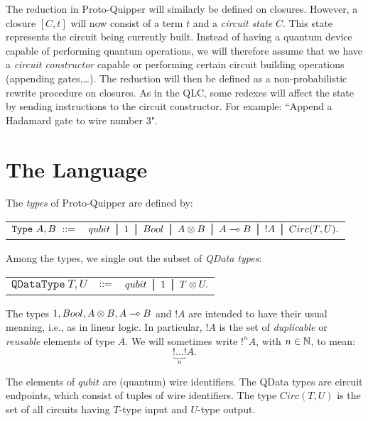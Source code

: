 \documentclass{article}
\begin{document}
The reduction in Proto-Quipper will similarly be defined on closures. However, a 
closure $[C,t]$ will now consist of a term $t$ and a \emph{circuit state} $C$. This 
state represents the circuit being currently built. Instead of having a quantum device 
capable of performing quantum operations, we will therefore assume that we have a 
\emph{circuit constructor} capable or performing certain circuit building operations 
(appending gates,\ldots). The reduction will then be defined as a non-probabilistic rewrite 
procedure on closures. As in the QLC, some redexes will affect the state by sending 
instructions to the circuit constructor. For example: ``Append a Hadamard gate to 
wire number 3".


\section{The Language}

\begin{definition} 
The \emph{types} of Proto-Quipper are defined by:
\begin{center}
\begin{tabular}{rl}
$\mathtt{Type}~A,B~::=$ & $ qubit \bor 1 \bor Bool \bor A\tensor B \bor A\loli B 
\bor !A \bor Circ (T,U).$\\
\end{tabular}
\end{center}
Among the types, we single out the subset of \emph{QData types}:
\begin{center}
\begin{tabular}{rcl}
$\mathtt{QDataType}~T,U$ & $::=$ & $qubit \bor 1 \bor T \tensor U.$
\end{tabular}
\end{center}
\end{definition}

The types $1,Bool, A\otimes B, A\multimap B$ and $!A$ are intended to have their usual 
meaning, i.e., as in linear logic. In particular, $!A$ is the set of 
\emph{duplicable} or \emph{reusable} elements of type $A$. We will 
sometimes write $!^nA$, with $n\in\mathbb{N}$, to mean: 
\[
\underbrace{!\ldots !}_{n} A.
\]

The elements of $qubit$ are (quantum) wire identifiers. The QData types are 
circuit endpoints, which consist of tuples of wire identifiers. The type 
$Circ(T,U)$ is the set of all circuits having $T$-type input and $U$-type 
output. 
\end{document}
